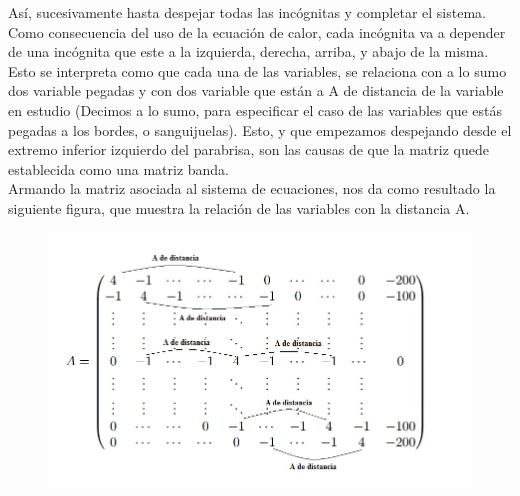     Así, sucesivamente hasta despejar todas las incógnitas y completar el sistema. Como consecuencia del uso de la ecuación de calor, cada incógnita va a depender de una incógnita que este a la izquierda, derecha, arriba, y abajo de la misma. Esto se interpreta como que cada una de las variables, se relaciona con a lo sumo dos variable pegadas y con dos variable que están a A de distancia de la variable en estudio (Decimos a lo sumo, para especificar el caso de las variables que estás pegadas a los bordes, o sanguijuelas). Esto, y que empezamos despejando desde el extremo inferior izquierdo del parabrisa, son las causas de que la matriz quede establecida como una matriz banda.\\
    Armando la matriz asociada al sistema de ecuaciones, nos da como resultado la siguiente figura, que muestra la relación de las variables con la distancia A.
    
        \begin{figure}[H]
    \centering
    \includegraphics[scale=0.7]{graphs/matriz.jpg}
      \end{figure}
    
    

